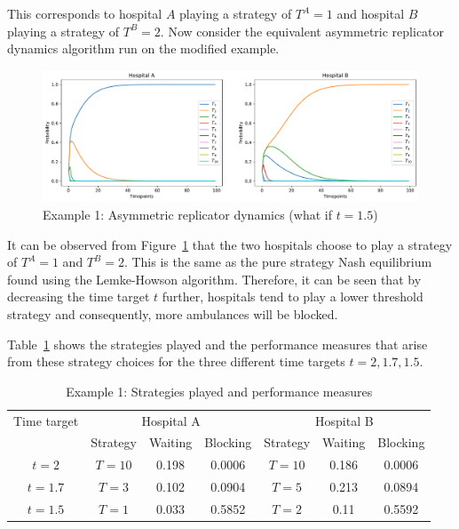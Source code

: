 This corresponds to hospital \(A\) playing a strategy of \(T^A = 1\) and
hospital \(B\) playing a strategy of \(T^B = 2\).
Now consider the equivalent asymmetric replicator dynamics algorithm run on
the modified example.

\begin{figure}[H]
    \centering
    \includegraphics[width=\linewidth]{chapters/05_numerical_results/Bin/example_1/what_if_t_1.5.pdf}
    \caption{Example 1: Asymmetric replicator dynamics (what if \(t = 1.5\))}
    \label{fig:asymmetric_replicator_dynamics_example_1_what_if_2}
\end{figure}

It can be observed from
Figure~\ref{fig:asymmetric_replicator_dynamics_example_1_what_if_2} that the
two hospitals choose to play a strategy of \(T^A = 1\) and \(T^B = 2\).
This is the same as the pure strategy Nash equilibrium found using the
Lemke-Howson algorithm.
Therefore, it can be seen that by decreasing the time target \(t\) further,
hospitals tend to play a lower threshold strategy and consequently, more
ambulances will be blocked.

Table~\ref{tab:example_1_strategies_played_and_performance_measures} shows the
strategies played and the performance measures that arise from these strategy
choices for the three different time targets \(t = 2, 1.7, 1.5\).

\begin{table}[H]
    \centering
    \caption{Example 1: Strategies played and performance measures}
    \begin{tabular}{|c|ccc|ccc|}
        \hline
        Time target & \multicolumn{3}{c|}{Hospital A} &
        \multicolumn{3}{c|}{Hospital B} \\
        & Strategy & Waiting & Blocking & Strategy & Waiting & Blocking \\
        \hline
        \(t = 2\) & \(T = 10\) & 0.198 & 0.0006 & \(T = 10\) & 0.186 & 0.0006 \\
        \(t = 1.7\) & \(T = 3\) & 0.102 & 0.0904 & \(T = 5\) & 0.213 & 0.0894 \\
        \(t = 1.5\) & \(T = 1\) & 0.033 & 0.5852 & \(T = 2\) & 0.11 & 0.5592 \\
        \hline
    \end{tabular}
    \label{tab:example_1_strategies_played_and_performance_measures}
\end{table}

